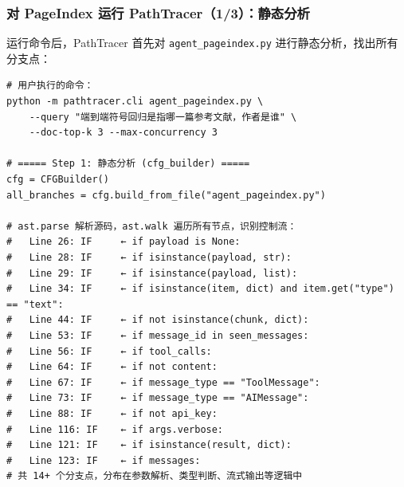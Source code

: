 \documentclass[presentation,aspectratio=169]{ctexbeamer}
\begin{document}
\begin{frame}[fragile]
\frametitle{对 PageIndex 运行 PathTracer（1/3）：静态分析}
{\scriptsize 运行命令后，PathTracer 首先对 \texttt{agent\_pageindex.py} 进行静态分析，找出所有分支点：}

\vspace{0.05cm}
{\tiny
\begin{verbatim}
# 用户执行的命令：
python -m pathtracer.cli agent_pageindex.py \
    --query "端到端符号回归是指哪一篇参考文献，作者是谁" \
    --doc-top-k 3 --max-concurrency 3

# ===== Step 1: 静态分析 (cfg_builder) =====
cfg = CFGBuilder()
all_branches = cfg.build_from_file("agent_pageindex.py")

# ast.parse 解析源码，ast.walk 遍历所有节点，识别控制流：
#   Line 26: IF     ← if payload is None:
#   Line 28: IF     ← if isinstance(payload, str):
#   Line 29: IF     ← if isinstance(payload, list):
#   Line 34: IF     ← if isinstance(item, dict) and item.get("type") == "text":
#   Line 44: IF     ← if not isinstance(chunk, dict):
#   Line 53: IF     ← if message_id in seen_messages:
#   Line 56: IF     ← if tool_calls:
#   Line 64: IF     ← if not content:
#   Line 67: IF     ← if message_type == "ToolMessage":
#   Line 73: IF     ← if message_type == "AIMessage":
#   Line 88: IF     ← if not api_key:
#   Line 116: IF    ← if args.verbose:
#   Line 121: IF    ← if isinstance(result, dict):
#   Line 123: IF    ← if messages:
# 共 14+ 个分支点，分布在参数解析、类型判断、流式输出等逻辑中
\end{verbatim}}
\end{frame}

\end{document}
